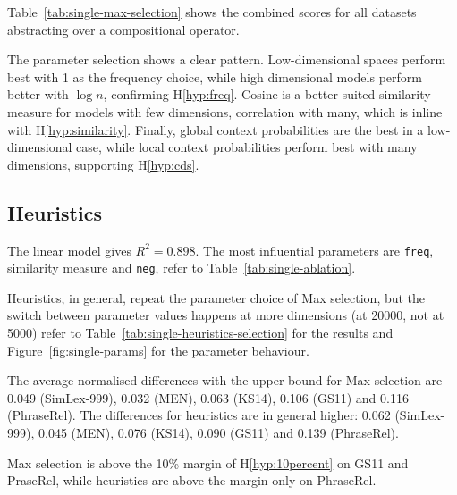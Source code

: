 Table~\ref{tab:single-max-selection} shows the combined scores for all datasets abstracting over a compositional operator.

The parameter selection shows a clear pattern. Low-dimensional spaces perform best with 1 as the frequency choice, while high dimensional models perform better with $\log n$, confirming H\ref{hyp:freq}. Cosine is a better suited similarity measure for models with few dimensions, correlation with many, which is inline with H\ref{hyp:similarity}. Finally, global context probabilities are the best in a low-dimensional case, while local context probabilities perform best with many dimensions, supporting H\ref{hyp:cds}.

\subsection{Heuristics}
\label{sec:heuristics-single}


The linear model gives $R^2 = 0.898$. The most influential parameters are \texttt{freq}, similarity measure and \texttt{neg}, refer to Table~\ref{tab:single-ablation}.

Heuristics, in general, repeat the parameter choice of Max selection, but the switch between parameter values happens at more dimensions (at 20000, not at 5000) refer to Table~\ref{tab:single-heuristics-selection} for the results and Figure~\ref{fig:single-params} for the parameter behaviour.

The average normalised differences with the upper bound for Max selection are 0.049 (SimLex-999), 0.032 (MEN), 0.063 (KS14), 0.106 (GS11) and 0.116 (PhraseRel). The differences for heuristics are in general higher: 0.062 (SimLex-999), 0.045 (MEN), 0.076 (KS14), 0.090 (GS11) and 0.139 (PhraseRel).

Max selection is above the 10\% margin of H\ref{hyp:10percent} on GS11 and PraseRel, while heuristics are above the margin only on PhraseRel.





